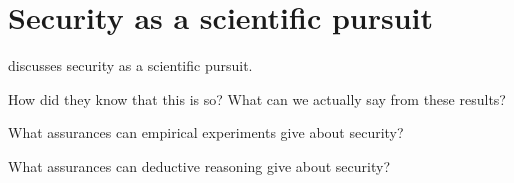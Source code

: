 \section{Security as a scientific pursuit}

\Textcite{SoKScienceOfSecurity} discusses security as a scientific pursuit.

\begin{frame}
  \begin{question}
    How did they know that this is so?
    What can we actually say from these results?
  \end{question}
\end{frame}

\begin{frame}
  \begin{question}
    What assurances can empirical experiments give about security?
  \end{question}

  \begin{question}
    What assurances can deductive reasoning give about security?
  \end{question}
\end{frame}

